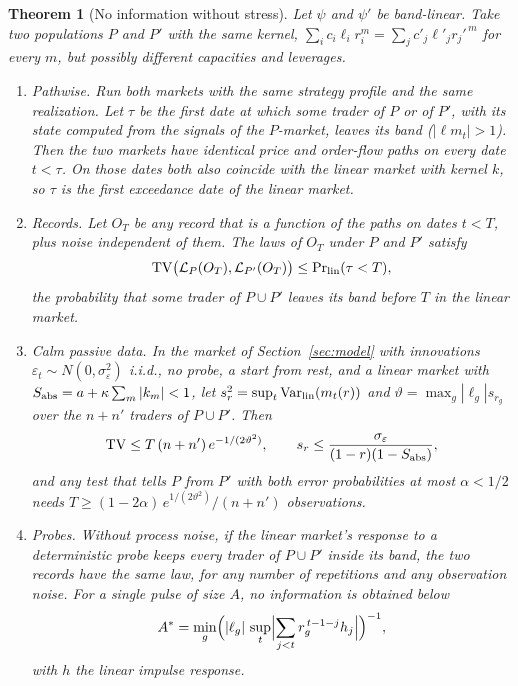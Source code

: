 \documentclass[12pt]{article}
\newtheorem{theorem}{Theorem}[section]
\theoremstyle{definition}
\theoremstyle{remark}
\begin{document}
\begin{theorem}[No information without stress]\label{thm:stress}
Let $\psi$ and $\psi'$ be band-linear. Take two populations $P$ and $P'$ with the same kernel, $\sum_ic_i\ell_ir_i^m=\sum_jc'_j\ell'_jr_j'^{\,m}$ for every $m$, but possibly different capacities and leverages.
\begin{enumerate}[label=(\roman*),itemsep=1pt]
\item \emph{Pathwise.} Run both markets with the same strategy profile and the same realization. Let $\tau$ be the first date at which some trader of $P$ or of $P'$, with its state computed from the signals of the $P$-market, leaves its band ($|\ell m_t|>1$). Then the two markets have identical price and order-flow paths on every date $t<\tau$. On those dates both also coincide with the \emph{linear} market with kernel $k$, so $\tau$ is the first exceedance date of the linear market.
\item \emph{Records.} Let $O_T$ be any record that is a function of the paths on dates $t<T$, plus noise independent of them. The laws of $O_T$ under $P$ and $P'$ satisfy
\[
 \mathrm{TV}\bigl(\mathcal L_P(O_T),\mathcal L_{P'}(O_T)\bigr)\le\Pr\nolimits_{\rm lin}(\tau<T),
\]
the probability that some trader of $P\cup P'$ leaves its band before $T$ in the linear market.
\item \emph{Calm passive data.} In the market of Section~\ref{sec:model} with innovations $\varepsilon_t\sim N(0,\sigma_\varepsilon^2)$ i.i.d., no probe, a start from rest, and a linear market with $S_{\rm abs}=a+\kappa\sum_m|k_m|<1$, let $s_r^2=\sup_t\mathrm{Var}_{\rm lin}(m_t(r))$ and $\vartheta=\max_g|\ell_g|s_{r_g}$ over the $n+n'$ traders of $P\cup P'$. Then
\[
 \mathrm{TV}\le T\,(n+n')\,e^{-1/(2\vartheta^2)},\qquad s_r\le\frac{\sigma_\varepsilon}{(1-r)(1-S_{\rm abs})},
\]
and any test that tells $P$ from $P'$ with both error probabilities at most $\alpha<1/2$ needs $T\ge(1-2\alpha)\,e^{1/(2\vartheta^2)}/(n+n')$ observations.
\item \emph{Probes.} Without process noise, if the linear market's response to a deterministic probe keeps every trader of $P\cup P'$ inside its band, the two records have the same law, for any number of repetitions and any observation noise. For a single pulse of size $A$, no information is obtained below
\[
 A^*=\min_g\Bigl(|\ell_g|\,\sup_t\Bigl|\sum_{j<t}r_g^{\,t-1-j}h_j\Bigr|\Bigr)^{-1},
\]
with $h$ the linear impulse response.
\end{enumerate}
\end{theorem}
\end{document}
